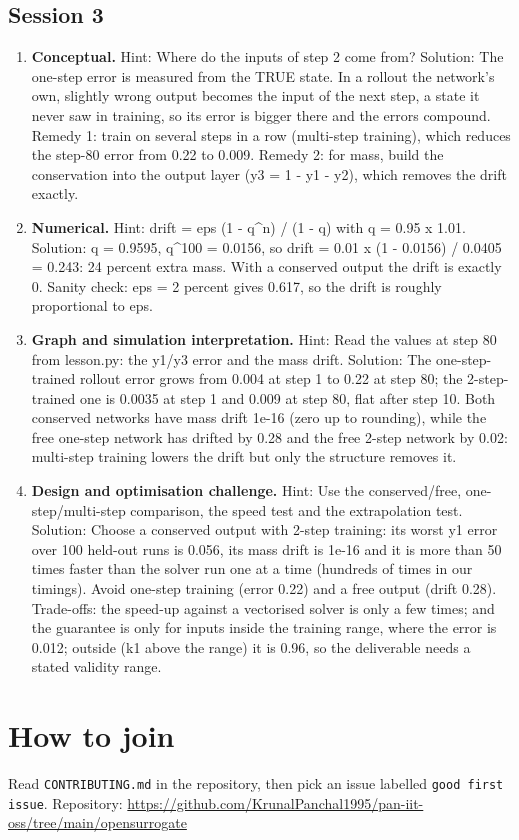 \documentclass[11pt,a4paper]{article}
\begin{document}
\subsection*{Session 3}
\begin{enumerate}[nosep]
\item \textbf{Conceptual.} Hint: Where do the inputs of step 2 come from? Solution: The one-step error is measured from the TRUE state. In a rollout the network's own, slightly wrong output becomes the input of the next step, a state it never saw in training, so its error is bigger there and the errors compound. Remedy 1: train on several steps in a row (multi-step training), which reduces the step-80 error from 0.22 to 0.009. Remedy 2: for mass, build the conservation into the output layer (y3 = 1 - y1 - y2), which removes the drift exactly.
\item \textbf{Numerical.} Hint: drift = eps (1 - q\textasciicircum{}n) / (1 - q) with q = 0.95 x 1.01. Solution: q = 0.9595, q\textasciicircum{}100 = 0.0156, so drift = 0.01 x (1 - 0.0156) / 0.0405 = 0.243: 24 percent extra mass. With a conserved output the drift is exactly 0. Sanity check: eps = 2 percent gives 0.617, so the drift is roughly proportional to eps.
\item \textbf{Graph and simulation interpretation.} Hint: Read the values at step 80 from lesson.py: the y1/y3 error and the mass drift. Solution: The one-step-trained rollout error grows from 0.004 at step 1 to 0.22 at step 80; the 2-step-trained one is 0.0035 at step 1 and 0.009 at step 80, flat after step 10. Both conserved networks have mass drift 1e-16 (zero up to rounding), while the free one-step network has drifted by 0.28 and the free 2-step network by 0.02: multi-step training lowers the drift but only the structure removes it.
\item \textbf{Design and optimisation challenge.} Hint: Use the conserved/free, one-step/multi-step comparison, the speed test and the extrapolation test. Solution: Choose a conserved output with 2-step training: its worst y1 error over 100 held-out runs is 0.056, its mass drift is 1e-16 and it is more than 50 times faster than the solver run one at a time (hundreds of times in our timings). Avoid one-step training (error 0.22) and a free output (drift 0.28). Trade-offs: the speed-up against a vectorised solver is only a few times; and the guarantee is only for inputs inside the training range, where the error is 0.012; outside (k1 above the range) it is 0.96, so the deliverable needs a stated validity range.
\end{enumerate}

\section{How to join}
Read \texttt{CONTRIBUTING.md} in the repository, then pick an issue labelled \texttt{good first issue}. Repository: \url{https://github.com/KrunalPanchal1995/pan-iit-oss/tree/main/opensurrogate}
\end{document}
